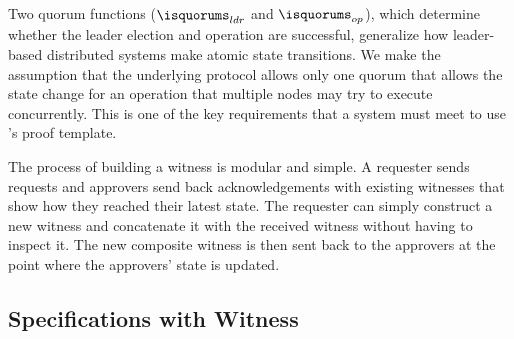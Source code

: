 Two quorum functions ($\isquorums_{ldr}$ and $\isquorums_{op}$), which determine whether the leader 
election and operation are successful, generalize how leader-based distributed 
systems make atomic state transitions. We make the assumption that the underlying
protocol allows only one quorum that allows the state change for an operation 
that multiple nodes may try to execute concurrently. This is one of the key
requirements that a system must meet to use \sysname{}'s proof template.

The process of building a witness is modular and simple. A requester sends
requests and approvers send back acknowledgements with existing witnesses that
show how they reached their latest state.
The requester can simply construct a new witness and concatenate it with the
received witness without having to inspect it.
The new composite witness is then sent back to the approvers at the point where
the approvers' state is updated.

\subsection{Specifications with Witness} 
\label{chapter:witnesspassing:subsec:specifications-with-witness}


